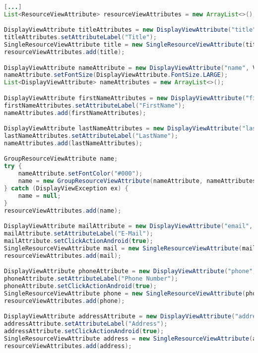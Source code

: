 \begin{lstlisting}[label=lst:cardview_impl,
language=java,
firstnumber=1,
caption=Erstellung einer \textit{CardView}.]			
[...]
List<ResourceViewAttribute> resourceViewAttributes = new ArrayList<>();

DisplayViewAttribute titleAttributes = new DisplayViewAttribute("title", ViewAttribute.AttributeType.TEXT);
titleAttributes.setAttributeLabel("Title");
SingleResourceViewAttribute title = new SingleResourceViewAttribute(titleAttributes);
resourceViewAttributes.add(title);

DisplayViewAttribute nameAttribute = new DisplayViewAttribute("name", ViewAttribute.AttributeType.TEXT);
nameAttribute.setFontSize(DisplayViewAttribute.FontSize.LARGE);
List<DisplayViewAttribute> nameAttributes = new ArrayList<>();

DisplayViewAttribute firstNameAttributes = new DisplayViewAttribute("firstName", ViewAttribute.AttributeType.TEXT);
firstNameAttributes.setAttributeLabel("FirstName");
nameAttributes.add(firstNameAttributes);

DisplayViewAttribute lastNameAttributes = new DisplayViewAttribute("lastName", ViewAttribute.AttributeType.TEXT);
lastNameAttributes.setAttributeLabel("LastName");
nameAttributes.add(lastNameAttributes);

GroupResourceViewAttribute name;
try {
	nameAttribute.setFontColor("#000");
	name = new GroupResourceViewAttribute(nameAttribute, nameAttributes);
} catch (DisplayViewException ex) {
	name = null;
}
resourceViewAttributes.add(name);

DisplayViewAttribute mailAttribute = new DisplayViewAttribute("email", ViewAttribute.AttributeType.MAIL);
mailAttribute.setAttributeLabel("E-Mail");
mailAttribute.setClickActionAndroid(true);
SingleResourceViewAttribute mail = new SingleResourceViewAttribute(mailAttribute);
resourceViewAttributes.add(mail);

DisplayViewAttribute phoneAttribute = new DisplayViewAttribute("phone", ViewAttribute.AttributeType.PHONE_NUMBER);
phoneAttribute.setAttributeLabel("Phone Number");
phoneAttribute.setClickActionAndroid(true);
SingleResourceViewAttribute phone = new SingleResourceViewAttribute(phoneAttribute);
resourceViewAttributes.add(phone);

DisplayViewAttribute addressAttribute = new DisplayViewAttribute("address", ViewAttribute.AttributeType.LOCATION);
addressAttribute.setAttributeLabel("Address");
addressAttribute.setClickActionAndroid(true);
SingleResourceViewAttribute address = new SingleResourceViewAttribute(addressAttribute);
resourceViewAttributes.add(address);


\end{lstlisting}
